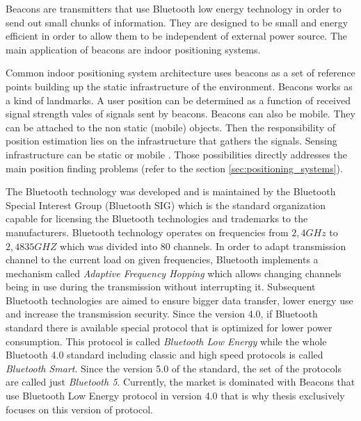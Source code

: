 \documentclass[../main.tex]{subfiles}
\begin{document}
Beacons are transmitters that use Bluetooth low energy technology in order to send out small chunks of information. They are designed to be small and energy efficient in order to allow them to be independent of external power source. The main application of beacons are indoor positioning systems.

Common indoor positioning system architecture uses beacons as a set of reference points building up the static infrastructure of the environment. Beacons works as a kind of landmarks. A user position can be determined as a function of received signal strength vales of signals sent by beacons. Beacons can also be mobile. They can be attached to the non static (mobile) objects. Then the responsibility of position estimation lies on the infrastructure that gathers the signals. Sensing infrastructure can be static or mobile \cite{discover_beacons_and_position}. Those possibilities directly addresses the main position finding problems (refer to the section \ref{sec:positioning_systems}).

The Bluetooth technology was developed and is maintained by the Bluetooth Special Interest Group (Bluetooth SIG) which is the standard organization capable for licensing the Bluetooth technologies and trademarks to the manufacturers. Bluetooth technology operates on frequencies from $2,4GHz$ to $2,4835GHZ$ which was divided into 80 channels. In order to adapt transmission channel to the current load on given frequencies, Bluetooth implements a mechanism called \textit{Adaptive Frequency Hopping} which allows changing channels being in use during the transmission without interrupting it. Subsequent Bluetooth technologies are aimed to ensure bigger data transfer, lower energy use and increase the transmission security. Since the version 4.0, if Bluetooth standard there is available special protocol that is optimized for lower power consumption. This protocol is called \textit{Bluetooth Low Energy} while the whole Bluetooth 4.0 standard including classic and high speed protocols is called \textit{Bluetooth Smart}. Since the version 5.0 of the standard, the set of the protocols are called just \textit{Bluetooth 5}. Currently, the market is dominated with Beacons that use Bluetooth Low Energy protocol in version 4.0 that is why thesis exclusively focuses on this version of protocol.
\end{document}
